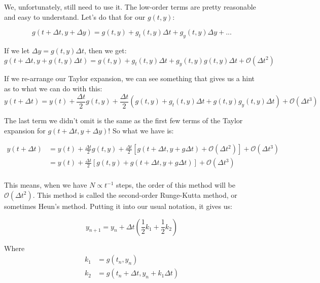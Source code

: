 \documentclass{article}
\theoremstyle{demo}
\begin{document}
We, unfortunately, still need to use it.  The low-order terms are pretty
reasonable and easy to understand.  Let's do that for our $g(t,y)$:

\begin{equation}
    g(t+\Delta t, y+\Delta y) = g(t,y) + g_t(t,y) \Delta t + g_y(t,y) \Delta y +
    ...
\end{equation}

If we let $\Delta y = g(t,y)\Delta t$, then we get:
\begin{equation}
    g(t+\Delta t, y+g(t,y)\Delta t) = g(t,y) + g_t(t,y) \Delta t + g_y(t,y)
    g(t,y) \Delta t + \mathcal{O}(\Delta t^2)
\end{equation}

If we re-arrange our Taylor expansion, we can see something that gives us a hint
as to what we can do with this:
\begin{equation}
    y(t+\Delta t) = y(t)+\frac{\Delta t}{2}g(t,y) + \frac{\Delta t}{2}(g(t,y) +
    g_t(t,y)\Delta t + g(t,y)g_y(t,y)\Delta t) + \mathcal{O}(\Delta t^3)
\end{equation}

The last term we didn't omit is the same as the first few terms of the Taylor
expansion for $g(t+\Delta t, y+\Delta y)$! So what we have is:

\begin{equation}
    \begin{aligned}
        y(t+\Delta t) &= y(t)+\frac{\Delta t}{2}g(t,y) + \frac{\Delta
    t}{2}\left[g(t+\Delta t, y + g\Delta t) + \mathcal{O}(\Delta t^2)\right] +
    \mathcal{O}(\Delta t^3)\\
        &= y(t)+\frac{\Delta t}{2}\left[g(t,y) + g(t+\Delta t, y + g\Delta t) \right] +
    \mathcal{O}(\Delta t^3)\\
    \end{aligned}
\end{equation}

This means, when we have $N\propto t^{-1}$ steps, the order of this method will
be $\mathcal{O}(\Delta t^2)$.  This method is called the second-order
Runge-Kutta method, or sometimes Heun's method.  Putting it into our usual
notation, it gives us:

\begin{equation}
    y_{n+1} = y_n + \Delta t(\frac{1}{2}k_1 + \frac{1}{2} k_2)
\end{equation}

Where
\begin{equation}
    \begin{aligned}
        k_1 &= g(t_n, y_n) \\
        k_2 &= g(t_n + \Delta t, y_n + k_1\Delta t) \\
    \end{aligned}
\end{equation}
\end{document}
